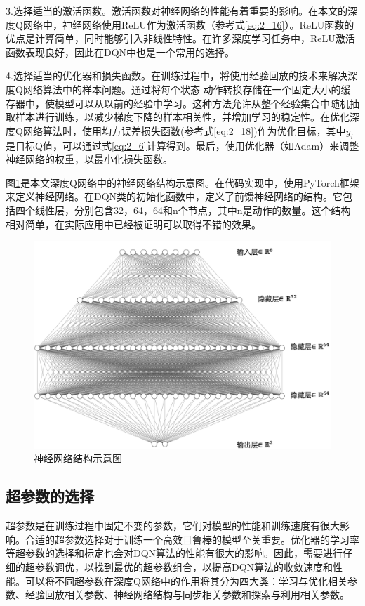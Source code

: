 3.选择适当的激活函数。激活函数对神经网络的性能有着重要的影响。在本文的深度Q网络中，神经网络使用ReLU作为激活函数（参考式\ref{eq:2_16}）。ReLU函数的优点是计算简单，同时能够引入非线性特性。在许多深度学习任务中，ReLU激活函数表现良好，因此在DQN中也是一个常用的选择。

4.选择适当的优化器和损失函数。在训练过程中，将使用经验回放的技术来解决深度Q网络算法中的样本问题。通过将每个状态-动作转换存储在一个固定大小的缓存器中，使模型可以从以前的经验中学习。这种方法允许从整个经验集合中随机抽取样本进行训练，以减少梯度下降的样本相关性，并增加学习的稳定性。在优化深度Q网络算法时，使用均方误差损失函数(参考式\ref{eq:2_18})作为优化目标，其中$y_i$是目标Q值，可以通过式\ref{eq:2_6}计算得到。最后，使用优化器（如Adam）来调整神经网络的权重，以最小化损失函数。

图\ref{neuralnet}是本文深度Q网络中的神经网络结构示意图。在代码实现中，使用PyTorch框架来定义神经网络。在DQN类的初始化函数中，定义了前馈神经网络的结构。它包括四个线性层，分别包含32，64，64和n个节点，其中n是动作的数量。这个结构相对简单，在实际应用中已经被证明可以取得不错的效果。

\begin{figure}[H]
  \centering
  \includegraphics[width=.75\linewidth]{figures/content/neuralnet.png}
  \caption{神经网络结构示意图}
  \label{neuralnet}
\end{figure}




\subsection{超参数的选择}

超参数是在训练过程中固定不变的参数，它们对模型的性能和训练速度有很大影响。合适的超参数选择对于训练一个高效且鲁棒的模型至关重要。优化器的学习率等超参数的选择和标定也会对DQN算法的性能有很大的影响。因此，需要进行仔细的超参数调优，以找到最优的超参数组合，以提高DQN算法的收敛速度和性能。可以将不同超参数在深度Q网络中的作用将其分为四大类：学习与优化相关参数、经验回放相关参数、神经网络结构与同步相关参数和探索与利用相关参数。

